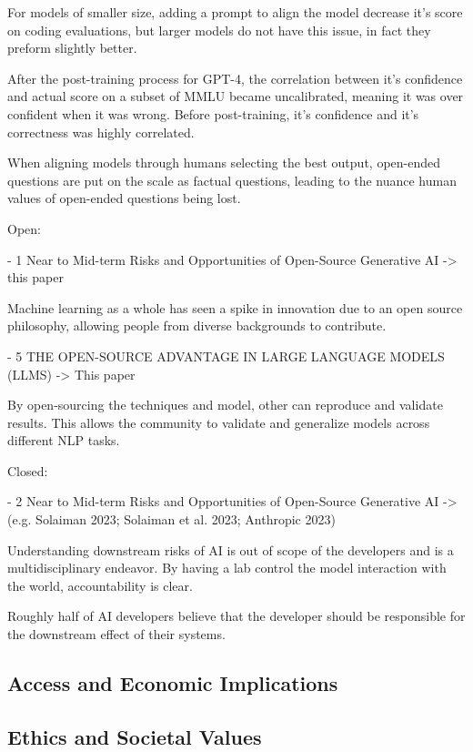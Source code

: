 For models of smaller size, adding a prompt to align the model decrease it's score on coding evaluations, but larger models do not have this issue, in fact they preform slightly better.

\citep{openai_gpt_4_2023}

After the post-training process for GPT-4, the correlation between it's confidence and actual score on a subset of MMLU became uncalibrated, meaning it was over confident when it was wrong. Before post-training, it's confidence and it's correctness was highly correlated.

\citep{song_reward_2023}

When aligning models through humans selecting the best output, open-ended questions are put on the scale as factual questions, leading to the nuance human values of open-ended questions being lost.

Open: 

- 1 Near to Mid-term Risks and Opportunities of Open-Source Generative AI -> this paper
\citep{eiras_near_2024}

Machine learning as a whole has seen a spike in innovation due to an open source philosophy, allowing people from diverse backgrounds to contribute.

- 5 THE OPEN-SOURCE ADVANTAGE IN LARGE LANGUAGE MODELS (LLMS) -> This paper
\citep{manchanda_open_2025}

By open-sourcing the techniques and model, other can reproduce and validate results. This allows the community to validate and generalize models across different NLP tasks.

Closed:

- 2 Near to Mid-term Risks and Opportunities of Open-Source Generative AI -> (e.g. Solaiman 2023; Solaiman et al. 2023; Anthropic 2023)
\citep{solaiman_gradient_2023}

Understanding downstream risks of AI is out of scope of the developers and is a multidisciplinary endeavor. By having a lab control the model interaction with the world, accountability is clear.

\citep{michael_what_2022}
Roughly half of AI developers believe that the developer should be responsible for the downstream effect of their systems.


\subsection{Access and Economic Implications}

\subsection{Ethics and Societal Values}
